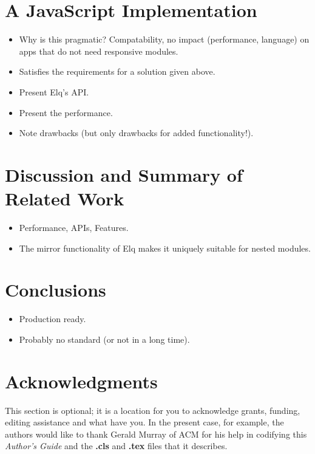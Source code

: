 \documentclass{acm_proc_article-sp}
\begin{document}
\section{A JavaScript Implementation}
  \begin{itemize}
    \item Why is this pragmatic? Compatability, no impact (performance, language) on apps that do not need responsive modules.
    \item Satisfies the requirements for a solution given above.
    \item Present Elq's API.
    \item Present the performance.
    \item Note drawbacks (but only drawbacks for added functionality!).
  \end{itemize}

\section{Discussion and Summary of Related Work}
  \begin{itemize}
    \item Performance, APIs, Features.
    \item The mirror functionality of Elq makes it uniquely suitable for nested modules.
  \end{itemize}

\section{Conclusions}
  \begin{itemize}
    \item Production ready.
    \item Probably no standard (or not in a long time).
  \end{itemize}


\section{Acknowledgments}
This section is optional; it is a location for you
to acknowledge grants, funding, editing assistance and
what have you.  In the present case, for example, the
authors would like to thank Gerald Murray of ACM for
his help in codifying this \textit{Author's Guide}
and the \textbf{.cls} and \textbf{.tex} files that it describes.

%

%
%
\end{document}

